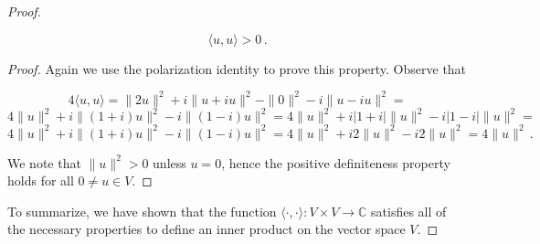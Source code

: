 \documentclass[a4paper]{article}
\numberwithin{equation}{section}
\begin{document}
\begin{description}
\begin{proof}
\begin{description}
$$\langle u,u \rangle > 0\,.$$

\begin{proof} Again we use the polarization identity to prove this property. Observe that

$$4\langle u,u \rangle = \|2u\|^2 + i\|u+iu\|^2 - \|0\|^2 -i\|u-iu\|^2 = $$
$$4\|u\|^2 + i\|(1+i)u\|^2 -i\|(1-i)u\|^2 = 4\|u\|^2 + i|1+i|\|u\|^2 -i|1-i|\|u\|^2 =$$
$$ 4\|u\|^2 + i\|(1+i)u\|^2 -i\|(1-i)u\|^2 = 4\|u\|^2 + i2\|u\|^2 -i2\|u\|^2 = 4\|u\|^2\,.$$

We note that $\|u\|^2 > 0$ unless $u = 0$, hence the positive definiteness property holds for all $0 \neq u \in V$.

\end{proof}

\end{description}


To summarize, we have shown that the function $\langle \cdot, \cdot \rangle : V \times V \rightarrow \mathbb{C}$ satisfies all of the necessary properties to define an inner product on the vector space $V$.

 
\end{proof}

\end{description}


	
	
	
	
	
\end{document}
